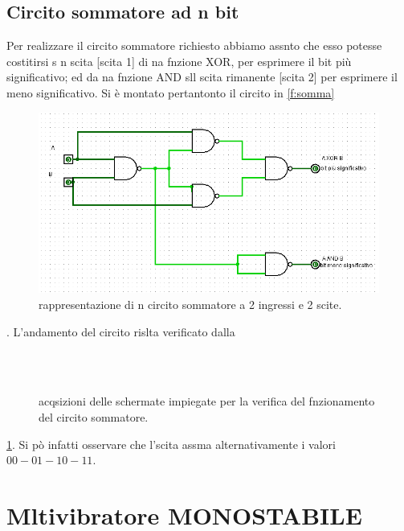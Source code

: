 \subsection{Circito sommatore ad n bit}	
	Per realizzare il circito sommatore richiesto abbiamo assnto
	che esso potesse costitirsi s n scita [scita 1] di na fnzione XOR, per esprimere il bit più significativo;
	ed da na fnzione AND sll scita rimanente [scita 2] per esprimere il meno significativo.
	Si è montato pertantonto il circito in \figurename{ \ref{f:somma}} 
		\begin{figure}[htb]
		\includegraphics[scale=1.0]{../Figs-Tabs/somma.png}
		\caption{rappresentazione di n circito sommatore a 2 ingressi e 2 scite.}
	\end{figure}\label{f:somma}
	.
	L'andamento del circito rislta verificato dalla 
	
	\begin{figure}[hb]
	\centering
	\\
	\\
	\caption{acqsizioni delle schermate impiegate per la verifica del fnzionamento del circito sommatore.}
	\label{f:osci-somma}
\end{figure}
	\figurename{ \ref{f:osci-somma}}.
	Si pò infatti osservare che l'scita assma alternativamente i valori $00-01-10-11$.
\section{Mltivibratore MONOSTABILE}